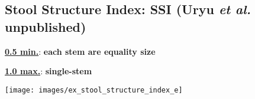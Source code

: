 \documentclass[a0, 25, plainboxedsections]{sciposter} %
\begin{document}
\begin{multicols}{2}
\vspace{-1.8em}\begin{figure}
 \begin{minipage}{0.6\hsize}
 \subsection*{Stool Structure Index: SSI \tiny(Uryu \textit{et al.} unpublished)}

\textbf{\underline{0.5 min.}}: \textbf{each stem are equality size}

\textbf{\underline{1.0 max.}}: \textbf{single-stem}
 \end{minipage}
 \begin{minipage}{0.4\hsize}
  \centering
   \texttt{[image: images/ex\_stool\_structure\_index\_e]}  
 \end{minipage}
\end{figure}

\end{multicols}
\begin{mdframed}[style=section.frame]
  \LARGE\textbf{\color{white}{\faLightbulb RESULTS}}
\end{mdframed}\vspace{-1.2em}
\end{document}
